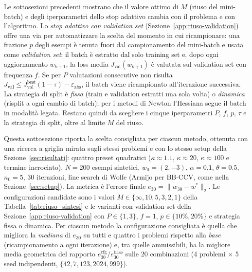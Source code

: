 Le sottosezioni precedenti mostrano che il valore ottimo di $M$ (riuso del
mini-batch) e degli iperparametri dello stop adattivo cambia con il problema e
con l'algoritmo. Lo \emph{stop adattivo con validation set}
(Sezione~\ref{app:riuso-validation}) offre una via per automatizzare la scelta
del momento in cui ricampionare: una frazione $p$ degli esempi è tenuta fuori
dal campionamento del mini-batch e usata come \emph{validation set}; il batch è
estratto dal solo training set e, dopo ogni aggiornamento $w_{k+1}$, la loss
media $J_{\mathrm{val}}(w_{k+1})$ è valutata sul validation set con frequenza
$f$. Se per $P$ valutazioni consecutive non risulta $J_{\mathrm{val}} \le
J_{\mathrm{val}}^{\mathrm{best}}(1-\tau)-\varepsilon_{\mathrm{abs}}$, il batch
viene ricampionato all'iterazione successiva. La strategia di split è
\emph{fissa} (train e validation estratti una sola volta) o \emph{dinamica}
(risplit a ogni cambio di batch); per i metodi di Newton l'Hessiana segue il
batch in modalità legata. Restano quindi da scegliere i cinque iperparametri
$P$, $f$, $p$, $\tau$ e la strategia di split, oltre al limite $M$ del riuso.

Questa sottosezione riporta la scelta consigliata per ciascun metodo, ottenuta
con una ricerca a griglia mirata sugli stessi problemi e con lo stesso setup
della Sezione~\ref{sec:risultati}: quattro preset quadratici
($\kappa\approx 1.1$, $\kappa\approx 20$, $\kappa\approx 100$ e termine
incrociato), $N = 200$ esempi sintetici, $w_0 = (2,-3)$, $\alpha = 0.1$,
$\theta = 0.5$, $n_0 = 5$, 30 iterazioni, line search di Wolfe (Armijo per
BB-CCV, come nella Sezione~\ref{sec:setup}). La metrica è l'errore finale
$e_{30} = \|w_{30} - w^*\|_2$. Le configurazioni candidate sono i valori
$M \in \{\infty, 10, 5, 3, 2, 1\}$ della
Tabella~\ref{tab:riuso_sintesi} e le varianti con validation set della
Sezione~\ref{app:riuso-validation} con $P \in \{1, 3\}$, $f = 1$,
$p \in \{10\%, 20\%\}$ e strategia fissa o dinamica. Per ciascun metodo la
configurazione consigliata è quella che migliora la \emph{mediana} di $e_{30}$
su tutti e quattro i problemi rispetto alla \emph{base} (ricampionamento a ogni
iterazione) e, tra quelle ammissibili, ha la migliore media geometrica del
rapporto $e_{30}^{\mathrm{cfg}}/e_{30}^{\mathrm{base}}$ sulle 20 combinazioni
(4 problemi $\times$ 5 seed indipendenti, $\{42,7,123,2024,999\}$).

